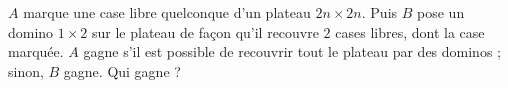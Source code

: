 $A$ marque une case libre quelconque d'un plateau $2n \times 2n$. Puis $B$ pose un domino $1 \times 2$ sur le plateau de façon qu'il recouvre $2$ cases libres, dont la case marquée. $A$ gagne s'il est possible de recouvrir tout le plateau par des dominos ; sinon, $B$ gagne. Qui gagne ?
